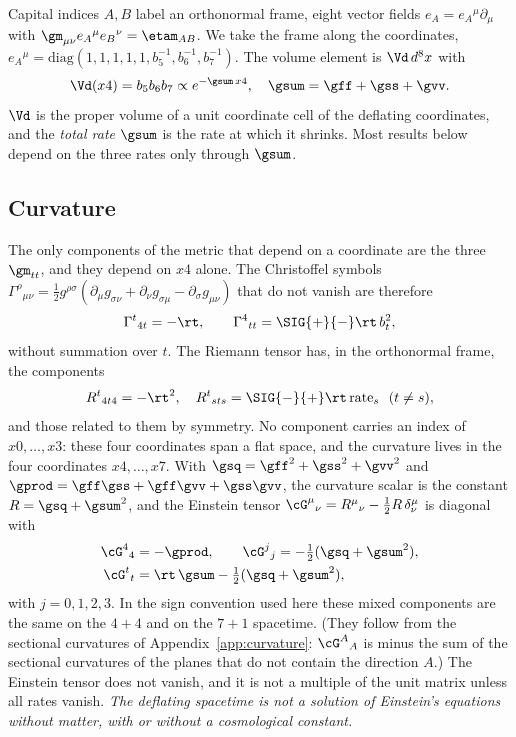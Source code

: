 Capital indices $A,B$ label an orthonormal frame, eight vector fields $e_A=e_A{}^{\mu}\partial_\mu$
with $\gm_{\mu\nu}e_A{}^{\mu}e_B{}^{\nu}=\etam_{AB}$. We take the frame along the coordinates,
$e_A{}^{\mu}=\mathrm{diag}(1,1,1,1,1,b_5^{-1},b_6^{-1},b_7^{-1})$. The volume element is $\Vd\,d^8x$
with
\begin{equation}
\Vd(x4)=b_5b_6b_7\propto e^{-\gsum\,x4},\quad\gsum=\gff+\gss+\gvv .
\label{eq:Vd}
\end{equation}
$\Vd$ is the proper volume of a unit coordinate cell of the deflating coordinates, and the
\emph{total rate} $\gsum$ is the rate at which it shrinks. Most results below depend on the three
rates only through $\gsum$.

\subsection{Curvature}
\label{sec:curvature}

The only components of the metric that depend on a coordinate are the three $\gm_{tt}$, and they
depend on $x4$ alone. The Christoffel symbols
$\Gamma^{\rho}{}_{\mu\nu}=\tfrac12g^{\rho\sigma}(\partial_\mu g_{\sigma\nu}+\partial_\nu g_{\sigma\mu}-\partial_\sigma g_{\mu\nu})$
that do not vanish are therefore
\begin{equation}
\Gamma^{t}{}_{4t}=-\rt,\qquad\Gamma^{4}{}_{tt}=\SIG{+}{-}\rt\,b_t^{2},
\end{equation}
without summation over $t$. The Riemann tensor has, in the orthonormal frame, the components
\begin{equation}
R^{t}{}_{4t4}=-\rt^{2},\quad R^{t}{}_{sts}=\SIG{-}{+}\rt\,\mathrm{rate}_s\ \ (t\ne s),
\label{eq:riemann}
\end{equation}
and those related to them by symmetry. No component carries an index of $x0,\dots,x3$: these four
coordinates span a flat space, and the curvature lives in the four coordinates $x4,\dots,x7$. With
$\gsq=\gff^2+\gss^2+\gvv^2$ and $\gprod=\gff\gss+\gff\gvv+\gss\gvv$, the curvature scalar is the
constant $R=\gsq+\gsum^{2}$, and the Einstein tensor
$\cG^{\mu}{}_{\nu}=R^{\mu}{}_{\nu}-\tfrac12R\,\delta^{\mu}_{\nu}$ is diagonal with
\begin{equation}
\begin{aligned}
\cG^{4}{}_{4}&=-\gprod,\qquad\cG^{j}{}_{j}=-\tfrac12(\gsq+\gsum^{2}),\\
\cG^{t}{}_{t}&=\rt\,\gsum-\tfrac12(\gsq+\gsum^{2}),
\end{aligned}
\label{eq:einstein}
\end{equation}
with $j=0,1,2,3$. In the sign convention used here these mixed components are the same on the $4+4$
and on the $7+1$ spacetime. (They follow from the sectional curvatures of Appendix~\ref{app:curvature}:
$\cG^{A}{}_{A}$ is minus the sum of the sectional curvatures of the planes that do not contain the
direction $A$.)
The Einstein tensor does not vanish, and it is not a multiple of the unit matrix unless all rates
vanish. \emph{The deflating spacetime is not a solution of Einstein's equations without matter, with
or without a cosmological constant.}


